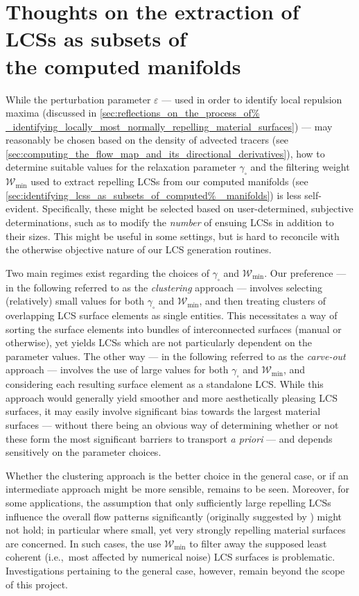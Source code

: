 \section[Thoughts on the extraction of LCSs as subsets of the computed manifolds]
{Thoughts on the extraction of LCSs as subsets of \\\phantom{5.5}
 the computed manifolds}
\label{sec:thoughts_on_the_extraction_of_lcss_as_subsets_of_the_computed%
_manifolds}

While the perturbation parameter $\varepsilon$ --- used in order to identify
local repulsion maxima (discussed in \cref{sec:reflections_on_the_process_of%
_identifying_locally_most_normally_repelling_material_surfaces}) --- may
reasonably be chosen based on the density of advected tracers (see
\cref{sec:computing_the_flow_map_and_its_directional_derivatives}), how to
determine suitable values for the relaxation parameter $\gamma_{\square}$ and
the filtering weight $\mathcal{W}_{\min}$ used to extract repelling LCSs from
our computed manifolds (see \cref{sec:identifying_lcss_as_subsets_of_computed%
_manifolds}) is less self-evident. Specifically, these might be selected based
on user-determined, subjective determinations, such as to modify the
\emph{number} of ensuing LCSs in addition to their sizes. This might be useful
in some settings, but is hard to reconcile with the otherwise objective nature
of our LCS generation routines.

Two main regimes exist regarding the choices of $\gamma_{\square}$ and
$\mathcal{W}_{\min}$. Our preference --- in the following referred to as the
\emph{clustering} approach --- involves selecting (relatively) small values for
both $\gamma_{\square}$ and $\mathcal{W}_{\min}$, and then treating clusters of
overlapping LCS surface elements as single entities. This necessitates a way of
sorting the surface elements into bundles of interconnected surfaces (manual or
otherwise), yet yields LCSs which are not particularly dependent on the
parameter values. The other way --- in the following referred to as the
\emph{carve-out} approach --- involves the use of large values for both
$\gamma_{\square}$ and $\mathcal{W}_{\min}$, and considering each resulting
surface element as a standalone LCS. While this approach would generally yield
smoother and more aesthetically pleasing LCS surfaces, it may easily involve
significant bias towards the largest material surfaces --- without there being
an obvious way of determining whether or not these form the most significant
barriers to transport \emph{a priori} --- and depends sensitively on the
parameter choices.

Whether the clustering approach is the better choice in the general case, or if
an intermediate approach might be more sensible, remains to be seen. Moreover,
for some applications, the assumption that only sufficiently large repelling
LCSs influence the overall flow patterns significantly (originally suggested
by \textcite{farazmand2012computing}) might not hold; in particular where
small, yet very strongly repelling material surfaces are concerned. In such
cases, the use $\mathcal{W}_{\min}$ to filter away the supposed least coherent
(i.e.,\ most affected by numerical noise) LCS surfaces is problematic.
Investigations pertaining to the general case, however, remain beyond the scope
of this project.
